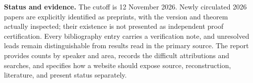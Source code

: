 \medskip
\noindent\textbf{Status and evidence.}
The cutoff is 12 November 2026. Newly circulated 2026 papers are explicitly
identified as preprints, with the version and theorem actually inspected;
their existence is not presented as independent proof certification.
Every bibliography entry carries a verification note, and unresolved
leads remain distinguishable from results read in the primary source.
The report provides counts by speaker and area, records the difficult
attributions and searches, and specifies how a website should expose
source, reconstruction, literature, and present status separately.
